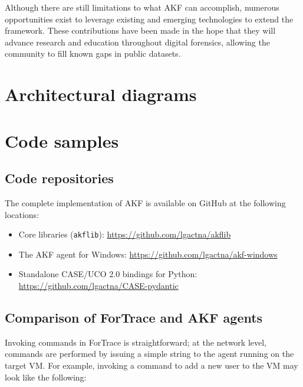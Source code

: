 \documentclass[letterpaper,12pt]{report}
\def\tightlist{}
\newcommand{\passthrough}[1]{#1}
\begin{document}
Although there are still limitations to what AKF can accomplish,
numerous opportunities exist to leverage existing and emerging
technologies to extend the framework. These contributions have been made
in the hope that they will advance research and education throughout
digital forensics, allowing the community to fill known gaps in public
datasets.



\printglossary[type=\acronymtype]
\printglossary

\singlespacing


\doublespacing
\appendix

\appendix

\chapter{Architectural diagrams}\label{appendix-a}



\chapter{Code samples}\label{appendix-b}

\section{Code repositories}\label{code-repositories}

The complete implementation of AKF is available on GitHub at the
following locations:

\begin{itemize}
\tightlist
\item
  Core libraries (\passthrough{\lstinline!akflib!}):
  \url{https://github.com/lgactna/akflib}
\item
  The AKF agent for Windows:
  \url{https://github.com/lgactna/akf-windows}
\item
  Standalone CASE/UCO 2.0 bindings for Python:
  \url{https://github.com/lgactna/CASE-pydantic}
\end{itemize}

\section{Comparison of ForTrace and AKF
agents}\label{comparison-of-fortrace-and-akf-agents}

Invoking commands in ForTrace
\cite{gobelForTraceHolisticForensic2022} is straightforward; at the
network level, commands are performed by issuing a simple string to the
agent running on the target VM. For example, invoking a command to add a
new user to the VM may look like the following:
\end{document}
